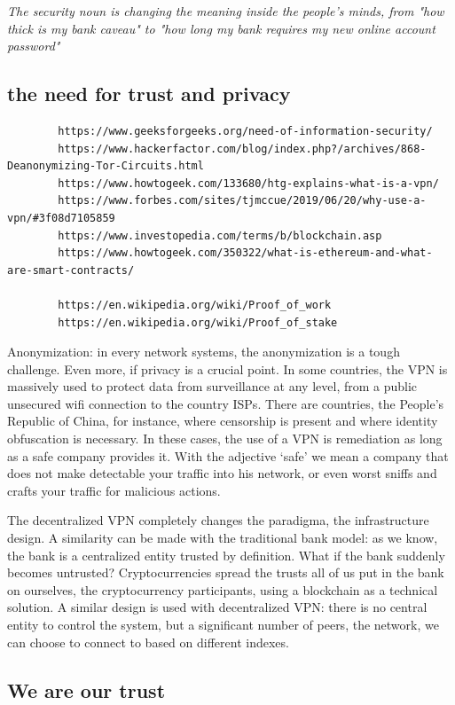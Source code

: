 \documentclass[]{article}
\begin{document}
	\textit{The security noun is changing the meaning inside the people's minds, from "how thick is my bank caveau" to "how long my bank requires my new online account password"}

	\subsection{the need for trust and privacy}

	\begin{verbatim}
		https://www.geeksforgeeks.org/need-of-information-security/
		https://www.hackerfactor.com/blog/index.php?/archives/868-Deanonymizing-Tor-Circuits.html
		https://www.howtogeek.com/133680/htg-explains-what-is-a-vpn/
		https://www.forbes.com/sites/tjmccue/2019/06/20/why-use-a-vpn/#3f08d7105859
		https://www.investopedia.com/terms/b/blockchain.asp
		https://www.howtogeek.com/350322/what-is-ethereum-and-what-are-smart-contracts/
		
		https://en.wikipedia.org/wiki/Proof_of_work
		https://en.wikipedia.org/wiki/Proof_of_stake
	\end{verbatim}
	
	Anonymization: in every network systems, the anonymization is a tough challenge. Even more, if privacy is a crucial point. In some countries, the VPN is massively used to protect data from surveillance at any level, from a public unsecured wifi connection to the country ISPs. There are countries, the People's Republic of China, for instance, where censorship is present and where identity obfuscation is necessary. In these cases, the use of a VPN is remediation as long as a safe company provides it. With the adjective `safe' we mean a company that does not make detectable your traffic into his network, or even worst sniffs and crafts your traffic for malicious actions. 

	The decentralized VPN completely changes the paradigma, the infrastructure design.
	A similarity can be made with the traditional bank model: as we know, the bank is a centralized entity trusted by definition. What if the bank suddenly becomes untrusted? Cryptocurrencies spread the trusts all of us put in the bank on ourselves, the cryptocurrency participants, using a blockchain as a technical solution. 
	A similar design is used with decentralized VPN: there is no central entity to control the system, but a significant number of peers, the network, we can choose to connect to based on different indexes.

	\subsection{We are our trust}
\end{document}
